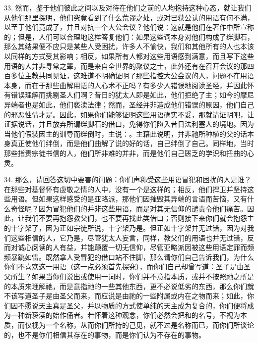 33. 然而，鉴于他们彼此之间以及对待在他们之前的人均抱持这种心态，就让我们从他们那里探明，他们究竟看到了什么荒谬之处，或对已获公认的用语有何不满，以至于他们竟成了，并且对抗一个大公会议？他们说：这就是他们在著作中所宣称的；但是，人们可以合理地这样答复他们：如果这些词本身对他们构成了绊脚石，那么其结果便不应只是某些人受困扰，许多人不愉快，我们和其他所有的人也本该以同样的方式受其影响；相反，如果所有人都对这些用语感到满意，而且写下这些用语的人并非寻常之辈，而是来自全世界的聚议之士，此外还有在召开会议的那四百多位主教共同见证，这难道不明确证明了那些指控大公会议的人，问题不在用语本身，而在于那些曲解用语的人心术不正吗？有多少人错误地阅读圣经，并因此怀有错误理解而挑剔圣人们啊？昔日的犹太人即是如此，他们拒绝了主；如今的摩尼异端者也是如此，他们亵渎法律；然而，圣经并非造成他们错误的原因，他们自己的邪恶性情才是。因此，如果你们能够证明这些用语确实不妥，那就请证明吧，让证据说话，并且放弃所谓绊脚石的借口，免得你们陷入昔日法利塞人的境地。因为当他们假装因主的训导而绊倒时，主说：。主藉此说明，并非祂所种植的父的话本身真正使他们绊倒，而是他们曲解了说的好的话，自己绊倒了自己。同样地，当时那些指责宗徒书信的人，他们所非难的并非，而是他们自己匮乏的学识和扭曲的心灵。\par

34. 那么，请回答这切中要害的问题：你们声称受这些用语冒犯和困扰的人是谁？在那些对基督怀有虔敬之情的人中，没有一个是这样的；相反，他们捍卫并坚持这些用语。但如果这样感受的是亚略派，那他们因摧毁其异端的言语而苦恼，又有什么奇怪呢？因为冒犯他们的并非这些用语，而是对其无信仰的谴责令他们痛苦。因此，让我们不要再抱怨教父们，也不要再找此类借口；否则接下来你们就会抱怨主的十字架了，因为正如宗徒所说，十字架乃是。但正如十字架并无过错，因为对我们这些相信的人，它乃是，尽管犹太人妄言，同样，教父们的用语也并无过错，反而对诚心阅读的人有益，并能颠覆一切无信仰，尽管亚略派因被这些用语定罪而频频暴跳如雷。既然拿人受冒犯的借口站不住脚，那么请你们自己告诉我们，为什么你们不喜欢这一用语（这一点必须首先探究），而你们自己却曾写道：圣子是由圣父所生？如果当你们说出或使用一词时，你们并不意指本质，或并不按照祂之所是的本质来理解祂，而是意指祂的一些其他东西，更不必说低劣的东西，那么你们就不该写道圣子是由圣父而来，而应说是由祂的一些附属或内在之物而来；如此，你们因不愿说天主真是圣父，并以物质的方式使单纯的天主成为复合的，你们便将成为一种新亵渎的始作俑者。若怀着这种观念，你们必然会把和的名号，不视为本质，而仅视为一个名称，从而你们所持的己见，就不过是名称而已，而你们所谈论的，也不是你们相信其存在的事物，而是你们认为不存在的事物。\par

